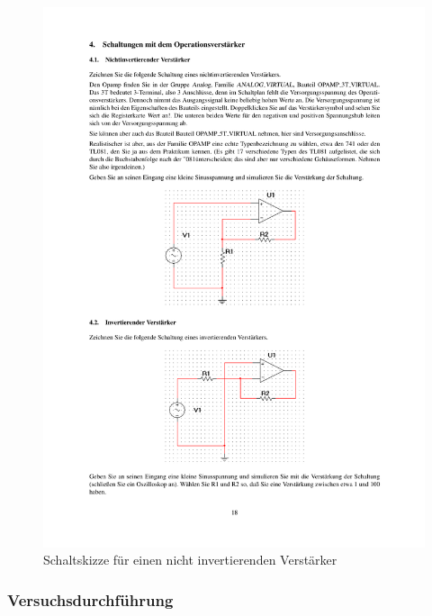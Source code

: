 \documentclass[12pt,a4paper]{article}
\begin{document}
\begin{figure}[H] 
  \centering
    \includegraphics[trim = 10mm 130mm 10mm 100mm, clip, scale = 1]{ep5_14[Page18].pdf}
  	\caption[Schaltskizze für einen nicht invertierenden Verstärker]{Schaltskizze für einen nicht invertierenden Verstärker\footnotemark}
  \label{fig:4_a_1}
\end{figure}

\subsubsection{Versuchsdurchführung}
\end{document}
